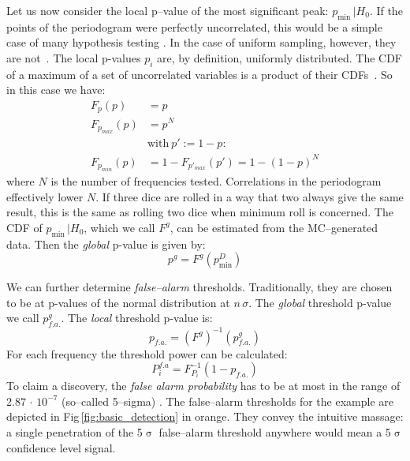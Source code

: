 
Let us now consider the local p--value of the most significant peak: $p_{\mathrm{min}} \, | H_0$. If the points of the periodogram were perfectly uncorrelated, this would be a simple case of many hypothesis testing \cite{Algeri2016}. In the case of uniform sampling, however, they are not~\cite{Scargle1982}. The local p-values $p_i$ are, by definition, uniformly distributed. The CDF of a maximum of a set of uncorrelated variables is a product of their CDFs~\cite{Papoulis2002}. So in this case we have:
\begin{align}\label{eq:Fpmin}
  F_p(p) &= p \\
  F_{p_{max}}(p) &= p^N \\
  &\text{with}\ p' := 1 - p :\\
  F_{p_{min}}(p) &= 1 - F_{p'_{max}}(p') = 1 - (1 - p)^N
\end{align}
where $N$ is the number of frequencies tested. Correlations in the periodogram effectively lower $N$.  If three dice are rolled in a way that two always give the same result, this is the same as rolling two dice when minimum roll is concerned. The CDF of $p_{\mathrm{min}} \, | H_0$, which we call $F^g$, can be estimated from the MC--generated data. Then the \emph{global} p-value is given by:
\begin{equation}
  p^g = F^g(p_{\mathrm{min}}^D)
\end{equation}

We can further determine \emph{false--alarm} thresholds. Traditionally, they are chosen to be at p-values of the normal distribution at $n \,\sigma$. The \emph{global} threshold p-value we call $p^g_{f.a.}$. The \emph{local} threshold p-value is:
\begin{equation}
  p_{f.a.} = \left( F^g \right)^{-1}(p^g_{f.a.})
\end{equation}
For each frequency the threshold power can be calculated:
\begin{equation}
  P^{f.a}_i = F_{P_i}^{-1}(1 - p_{f.a.})
\end{equation}
To claim a discovery, the \emph{false alarm probability} has to be at most in the range of $2.87\,\cdot\,10^{-7}$ (so--called 5--sigma) \cite{PDG2016}. The false--alarm thresholds for the example are depicted in Fig\,\ref{fig:basic_detection} in orange. They convey the intuitive massage: a single penetration of the 5$\upsigma$ false--alarm threshold anywhere would mean a 5$\upsigma$ confidence level signal.

